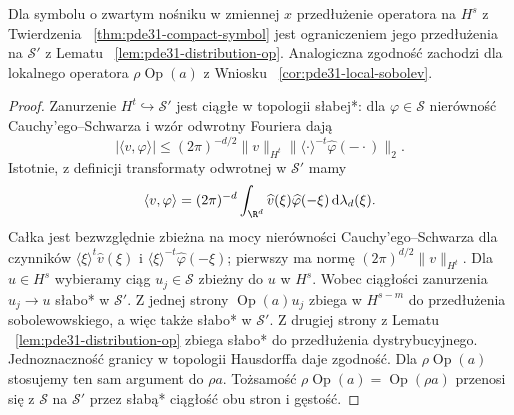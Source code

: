 \begin{wniosek}
\label{cor:pde31-extension-compatibility}
Dla symbolu o zwartym nośniku w zmiennej $x$
przedłużenie operatora na $H^s$ z Twierdzenia
~\ref{thm:pde31-compact-symbol} jest ograniczeniem
jego przedłużenia na $\mathcal S'$ z Lematu
~\ref{lem:pde31-distribution-op}.
Analogiczna zgodność zachodzi dla lokalnego
operatora $\rho\operatorname{Op}(a)$ z Wniosku
~\ref{cor:pde31-local-sobolev}.
\end{wniosek}
\begin{proof}
Zanurzenie $H^t\hookrightarrow\mathcal S'$ jest
ciągłe w topologii słabej*: dla $\varphi\in\mathcal S$
nierówność Cauchy'ego--Schwarza i wzór odwrotny
Fouriera dają
\[
 |\langle v,\varphi\rangle|
 \le(2\pi)^{-d/2}\|v\|_{H^t}
 \|\langle\cdot\rangle^{-t}\widehat\varphi(-\cdot)\|_2.
\]
Istotnie, z definicji transformaty odwrotnej w
$\mathcal S'$ mamy
\[
 \langle v,\varphi\rangle=(2\pi)^{-d}
 \int_{\R^d}\widehat v(\xi)\widehat\varphi(-\xi)
 \,\mathrm d\lambda_d(\xi).
\]
Całka jest bezwzględnie zbieżna na mocy
nierówności Cauchy'ego--Schwarza dla czynników
$\langle\xi\rangle^t\widehat v(\xi)$
i $\langle\xi\rangle^{-t}\widehat\varphi(-\xi)$;
pierwszy ma normę $(2\pi)^{d/2}\|v\|_{H^t}$.
Dla $u\in H^s$ wybieramy ciąg $u_j\in\mathcal S$
zbieżny do $u$ w $H^s$. Wobec ciągłości zanurzenia
$u_j\to u$ słabo* w $\mathcal S'$.
Z jednej strony $\operatorname{Op}(a)u_j$
zbiega w $H^{s-m}$ do przedłużenia sobolewowskiego,
a więc także słabo* w $\mathcal S'$.
Z drugiej strony z Lematu
~\ref{lem:pde31-distribution-op} zbiega słabo*
do przedłużenia dystrybucyjnego.
Jednoznaczność granicy w topologii Hausdorffa
daje zgodność.
Dla $\rho\operatorname{Op}(a)$ stosujemy
ten sam argument do $\rho a$. Tożsamość
$\rho\operatorname{Op}(a)=\operatorname{Op}(\rho a)$
przenosi się z $\mathcal S$ na $\mathcal S'$
przez słabą* ciągłość obu stron i gęstość.
\end{proof}


